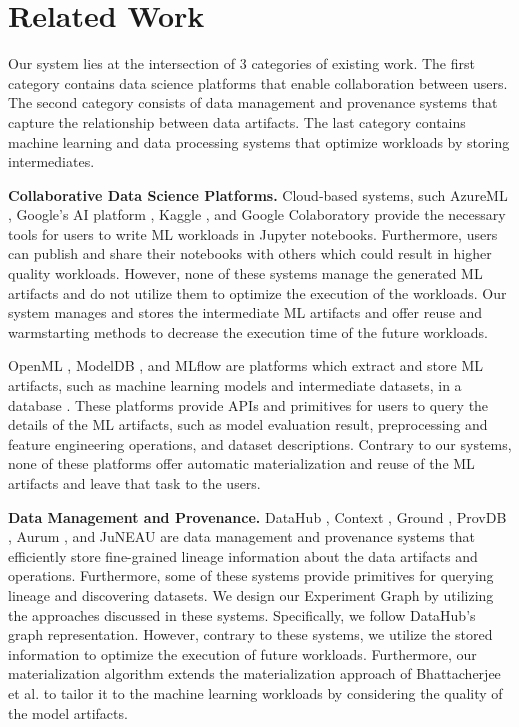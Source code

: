 \section{Related Work} \label{sec-related-work}
Our system lies at the intersection of 3 categories of existing work.
The first category contains data science platforms that enable collaboration between users.
The second category consists of data management and provenance systems that capture the relationship between data artifacts.
The last category contains machine learning and data processing systems that optimize workloads by storing intermediates.

\textbf{Collaborative Data Science Platforms.}
Cloud-based systems, such AzureML \cite{team2016azureml}, Google's AI platform \cite{googleai}, Kaggle \cite{kagglewebsite}, and Google Colaboratory \cite{googlecolab} provide the necessary tools for users to write ML workloads in Jupyter notebooks.
Furthermore, users can publish and share their notebooks with others which could result in higher quality workloads.
However, none of these systems manage the generated ML artifacts and do not utilize them to optimize the execution of the workloads.
Our system manages and stores the intermediate ML artifacts and offer reuse and warmstarting methods to decrease the execution time of the future workloads.

OpenML \cite{vanschoren2014openml}, ModelDB \cite{vartak2016m}, and MLflow \cite{zaharia2018accelerating} are platforms which extract and store ML artifacts, such as machine learning models and intermediate datasets, in a database \cite{schelter2017automatically, Vanschoren2012}.
These platforms provide APIs and primitives for users to query the details of the ML artifacts, such as model evaluation result, preprocessing and feature engineering operations, and dataset descriptions.
Contrary to our systems, none of these platforms offer automatic materialization and reuse of the ML artifacts and leave that task to the users.

\textbf{Data Management and Provenance.}
DataHub \cite{bhardwaj2014datahub, bhattacherjee2015principles}, Context \cite{garcia2018context}, Ground \cite{hellerstein2017ground}, ProvDB \cite{miao2018provdb}, Aurum \cite{fernandez2018aurum}, and JuNEAU \cite{ives2019dataset} are data management and provenance systems that efficiently store fine-grained lineage information about the data artifacts and operations.
Furthermore, some of these systems provide primitives for querying lineage and discovering datasets.
We design our Experiment Graph by utilizing the approaches discussed in these systems.
Specifically, we follow DataHub's graph representation.
However, contrary to these systems, we utilize the stored information to optimize the execution of future workloads.
Furthermore, our materialization algorithm extends the materialization approach of Bhattacherjee et al. \cite{bhattacherjee2015principles} to tailor it to the machine learning workloads by considering the quality of the model artifacts.

